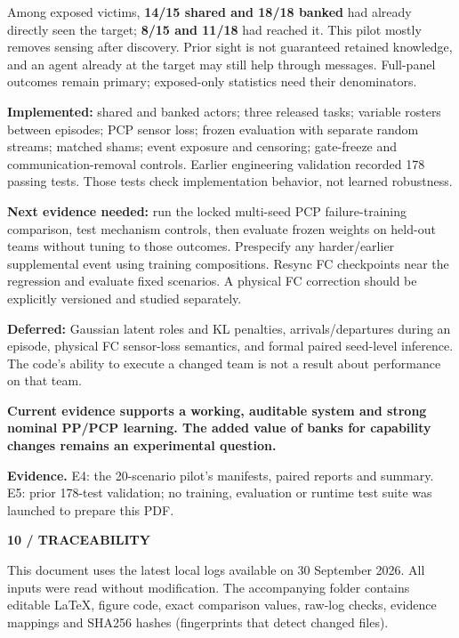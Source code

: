 \documentclass[11pt,letterpaper]{article}
\newcommand{\eyebrow}[1]{{\small\bfseries\color{teal}#1}\par\vspace{3pt}}
\newcommand{\pagetitle}[2]{\eyebrow{#1}{\fontsize{25}{28}\selectfont\bfseries #2\par}\vspace{7pt}}
\newcommand{\sub}[1]{\par\vspace{5pt}{\large\bfseries #1}\par\vspace{1pt}}
\newcommand{\takeaway}[1]{\par\vspace{5pt}\noindent\colorbox{pale}{\parbox{\dimexpr\linewidth-18pt\relax}{\vspace{5pt}\textbf{#1}\vspace{5pt}}}\par\vspace{3pt}}
\newcommand{\evidence}[1]{\vfill{\fontsize{8.4}{10.5}\selectfont\color{muted}\textbf{Evidence.} #1\par}}
\begin{document}
Among exposed victims, \textbf{14/15 shared and 18/18 banked} had already directly seen the target; \textbf{8/15 and 11/18} had reached it. This pilot mostly removes sensing after discovery. Prior sight is not guaranteed retained knowledge, and an agent already at the target may still help through messages. Full-panel outcomes remain primary; exposed-only statistics need their denominators.

\sub{What is implemented, and what remains}
\textbf{Implemented:} shared and banked actors; three released tasks; variable rosters between episodes; PCP sensor loss; frozen evaluation with separate random streams; matched shams; event exposure and censoring; gate-freeze and communication-removal controls. Earlier engineering validation recorded 178 passing tests. Those tests check implementation behavior, not learned robustness.

\textbf{Next evidence needed:} run the locked multi-seed PCP failure-training comparison, test mechanism controls, then evaluate frozen weights on held-out teams without tuning to those outcomes. Prespecify any harder/earlier supplemental event using training compositions. Resync FC checkpoints near the regression and evaluate fixed scenarios. A physical FC correction should be explicitly versioned and studied separately.

\textbf{Deferred:} Gaussian latent roles and KL penalties, arrivals/departures during an episode, physical FC sensor-loss semantics, and formal paired seed-level inference. The code's ability to execute a changed team is not a result about performance on that team.
\takeaway{Current evidence supports a working, auditable system and strong nominal PP/PCP learning. The added value of banks for capability changes remains an experimental question.}
\evidence{E4: the 20-scenario pilot's manifests, paired reports and summary. E5: prior 178-test validation; no training, evaluation or runtime test suite was launched to prepare this PDF.}

\newpage
\pagetitle{10 / TRACEABILITY}{How to check every result}
This document uses the latest local logs available on 30 September 2026. All inputs were read without modification. The accompanying folder contains editable LaTeX, figure code, exact comparison values, raw-log checks, evidence mappings and SHA256 hashes (fingerprints that detect changed files).
\end{document}
